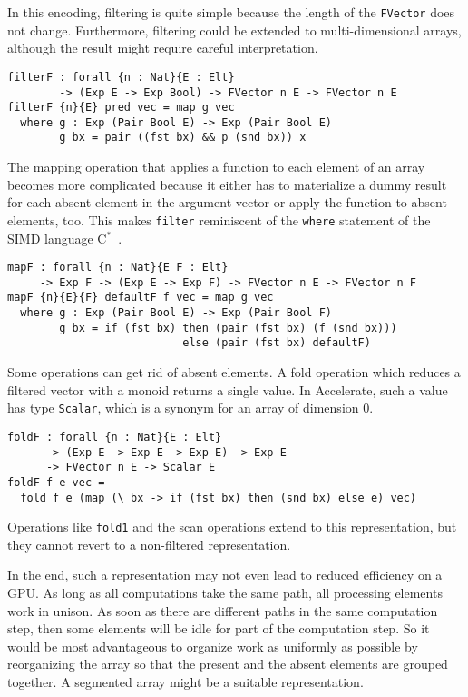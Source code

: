 \documentclass{llncs}
\begin{document}
In this encoding, filtering is quite simple because the length of
the \texttt{FVector} does not change. Furthermore, filtering could be
extended to multi-dimensional arrays, although the result might
require careful interpretation.
\begin{verbatim}
filterF : forall {n : Nat}{E : Elt}
        -> (Exp E -> Exp Bool) -> FVector n E -> FVector n E
filterF {n}{E} pred vec = map g vec
  where g : Exp (Pair Bool E) -> Exp (Pair Bool E)
        g bx = pair ((fst bx) && p (snd bx)) x
\end{verbatim}
The mapping operation that applies a function to each element of an
array becomes more complicated because it either has to 
materialize a dummy result for each absent element in the argument
vector or apply the function to absent elements, too. This makes \texttt{filter} reminiscent of the \texttt{where} statement of the SIMD language C$^*$~\cite{rose-etal:c-star}.
\begin{verbatim}
mapF : forall {n : Nat}{E F : Elt}
     -> Exp F -> (Exp E -> Exp F) -> FVector n E -> FVector n F
mapF {n}{E}{F} defaultF f vec = map g vec
  where g : Exp (Pair Bool E) -> Exp (Pair Bool F)
        g bx = if (fst bx) then (pair (fst bx) (f (snd bx)))
                           else (pair (fst bx) defaultF)
\end{verbatim}
Some operations can get rid of absent
elements. A fold operation which reduces a filtered
vector with a monoid returns a single value. In Accelerate, such a value has type
\texttt{Scalar}, which is a synonym for an array of dimension $0$.
\begin{verbatim}
foldF : forall {n : Nat}{E : Elt}
      -> (Exp E -> Exp E -> Exp E) -> Exp E
      -> FVector n E -> Scalar E
foldF f e vec =
  fold f e (map (\ bx -> if (fst bx) then (snd bx) else e) vec)
\end{verbatim}
Operations like \texttt{fold1} and the scan operations
extend to this representation, but they
cannot revert to a
non-filtered representation. 

In the end, such a representation may not even lead to reduced efficiency on a GPU. As long
as all computations take the same path, all processing elements work
in unison. As soon as there are different paths in the same
computation step, then some elements will be idle for part of the
computation step. So it would be most advantageous to organize work as
uniformly as possible by reorganizing the array so that the present
and the absent elements are grouped together. A segmented array might
be a suitable representation.
\end{document}
